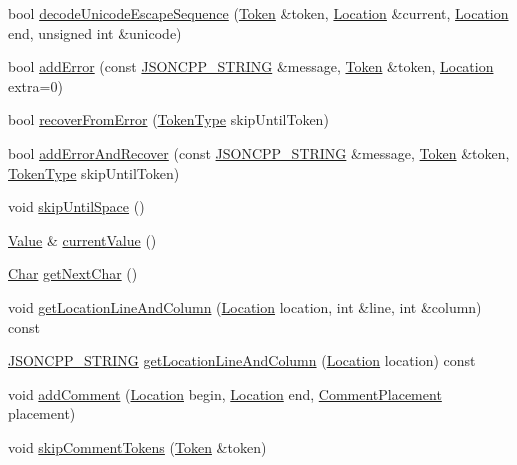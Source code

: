 \begin{DoxyCompactItemize}
\item 
bool \hyperlink{class_json_1_1_reader_a469cb6f55971d7c41fca2752a3aa5bf7}{decode\+Unicode\+Escape\+Sequence} (\hyperlink{class_json_1_1_reader_1_1_token}{Token} \&token, \hyperlink{class_json_1_1_reader_a46795b5b272bf79a7730e406cb96375a}{Location} \&current, \hyperlink{class_json_1_1_reader_a46795b5b272bf79a7730e406cb96375a}{Location} end, unsigned int \&unicode)
\item 
bool \hyperlink{class_json_1_1_reader_af02176a1d2786b4415bbb00a1b10bb6b}{add\+Error} (const \hyperlink{config_8h_a1e723f95759de062585bc4a8fd3fa4be}{J\+S\+O\+N\+C\+P\+P\+\_\+\+S\+T\+R\+I\+NG} \&message, \hyperlink{class_json_1_1_reader_1_1_token}{Token} \&token, \hyperlink{class_json_1_1_reader_a46795b5b272bf79a7730e406cb96375a}{Location} extra=0)
\item 
bool \hyperlink{class_json_1_1_reader_a8d4ed03a43082c5ace81ba5b81425eaf}{recover\+From\+Error} (\hyperlink{class_json_1_1_reader_aa35e6ab574dc399a0a645ad98ed66bc9}{Token\+Type} skip\+Until\+Token)
\item 
bool \hyperlink{class_json_1_1_reader_a478db8ac6d00db1409608a37b66bc38d}{add\+Error\+And\+Recover} (const \hyperlink{config_8h_a1e723f95759de062585bc4a8fd3fa4be}{J\+S\+O\+N\+C\+P\+P\+\_\+\+S\+T\+R\+I\+NG} \&message, \hyperlink{class_json_1_1_reader_1_1_token}{Token} \&token, \hyperlink{class_json_1_1_reader_aa35e6ab574dc399a0a645ad98ed66bc9}{Token\+Type} skip\+Until\+Token)
\item 
void \hyperlink{class_json_1_1_reader_ad922ea5a8ab333084edbb84827861fa3}{skip\+Until\+Space} ()
\item 
\hyperlink{class_json_1_1_value}{Value} \& \hyperlink{class_json_1_1_reader_a1cab5c0f13de764be705d636701ffbad}{current\+Value} ()
\item 
\hyperlink{class_json_1_1_reader_a3eec9118f3e9a672ba8348c3a79d0f45}{Char} \hyperlink{class_json_1_1_reader_a2e310761d1ccef53e8b78b5d78d6659b}{get\+Next\+Char} ()
\item 
void \hyperlink{class_json_1_1_reader_a8b2fb6af24382c3914fd4643b092c675}{get\+Location\+Line\+And\+Column} (\hyperlink{class_json_1_1_reader_a46795b5b272bf79a7730e406cb96375a}{Location} location, int \&line, int \&column) const
\item 
\hyperlink{config_8h_a1e723f95759de062585bc4a8fd3fa4be}{J\+S\+O\+N\+C\+P\+P\+\_\+\+S\+T\+R\+I\+NG} \hyperlink{class_json_1_1_reader_a49757dec5a1a53eff388dc7bf2bda890}{get\+Location\+Line\+And\+Column} (\hyperlink{class_json_1_1_reader_a46795b5b272bf79a7730e406cb96375a}{Location} location) const
\item 
void \hyperlink{class_json_1_1_reader_aaea3bd62d12ffb6117a61476c0685049}{add\+Comment} (\hyperlink{class_json_1_1_reader_a46795b5b272bf79a7730e406cb96375a}{Location} begin, \hyperlink{class_json_1_1_reader_a46795b5b272bf79a7730e406cb96375a}{Location} end, \hyperlink{namespace_json_a4fc417c23905b2ae9e2c47d197a45351}{Comment\+Placement} placement)
\item 
void \hyperlink{class_json_1_1_reader_a22e677ef400d8223f27e631b4cd4b821}{skip\+Comment\+Tokens} (\hyperlink{class_json_1_1_reader_1_1_token}{Token} \&token)
\end{DoxyCompactItemize}
